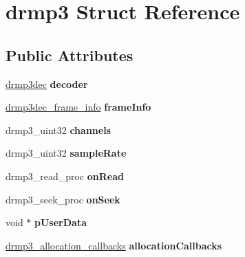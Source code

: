 \hypertarget{structdrmp3}{\section{drmp3 Struct Reference}
\label{structdrmp3}
}
\subsection*{Public Attributes}
\begin{DoxyCompactItemize}
\item 
\hypertarget{structdrmp3_aff4724123bbdf3b8e3071601c1f73ff7}{\hyperlink{structdrmp3dec}{drmp3dec} {\bfseries decoder}}\label{structdrmp3_aff4724123bbdf3b8e3071601c1f73ff7}

\item 
\hypertarget{structdrmp3_aa855f80f6dbc32827875ca95c8ea29bb}{\hyperlink{structdrmp3dec__frame__info}{drmp3dec\-\_\-frame\-\_\-info} {\bfseries frame\-Info}}\label{structdrmp3_aa855f80f6dbc32827875ca95c8ea29bb}

\item 
\hypertarget{structdrmp3_ade030203edf619566625bd278421d4e7}{drmp3\-\_\-uint32 {\bfseries channels}}\label{structdrmp3_ade030203edf619566625bd278421d4e7}

\item 
\hypertarget{structdrmp3_a125a69b581af18055b9aced80a68ddea}{drmp3\-\_\-uint32 {\bfseries sample\-Rate}}\label{structdrmp3_a125a69b581af18055b9aced80a68ddea}

\item 
\hypertarget{structdrmp3_aba375c193b3077addacb4ec3b7907752}{drmp3\-\_\-read\-\_\-proc {\bfseries on\-Read}}\label{structdrmp3_aba375c193b3077addacb4ec3b7907752}

\item 
\hypertarget{structdrmp3_ab40a369b3de3d2991076a566570a459b}{drmp3\-\_\-seek\-\_\-proc {\bfseries on\-Seek}}\label{structdrmp3_ab40a369b3de3d2991076a566570a459b}

\item 
\hypertarget{structdrmp3_addb6bdb74e7b37f350c167ae211541df}{void $\ast$ {\bfseries p\-User\-Data}}\label{structdrmp3_addb6bdb74e7b37f350c167ae211541df}

\item 
\hypertarget{structdrmp3_abd13e25085798cc56e1666ba42957298}{\hyperlink{structdrmp3__allocation__callbacks}{drmp3\-\_\-allocation\-\_\-callbacks} {\bfseries allocation\-Callbacks}}\label{structdrmp3_abd13e25085798cc56e1666ba42957298}


\end{DoxyCompactItemize}
